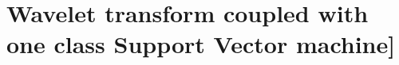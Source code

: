 \documentclass[../Main/thesis.tex]{subfiles}
\begin{document}
\chapter[Wavelet transform coupled with one class Support Vector machine]{Wavelet transform coupled with one class Support Vector machine]}
\label{sec:waveletandsvm}
\blankpage
\end{document}
